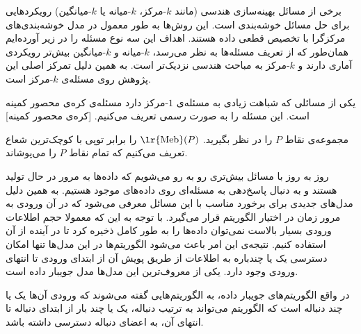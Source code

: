 برخی از مسائل بهینه‌سازی هندسی (مانند $k$-مرکز، $k$-میانه یا $k$-میانگین) رویکردهایی برای حل مسائل خوشه‌بندی است. این روش‌ها به طور معمول در مدل خوشه‌بندی‌های مرکزگرا با تخصیص قطعی داده هستند.  اهداف این سه نوع مسئله را در زیر آورده‌ایم
 
همان‌طور که از تعریف مسئله‌ها به نظر می‌رسد، $k$-میانه و $k$-میانگین بیش‌تر رویکردی آماری دارند و $k$-مرکز به مباحث هندسی نزدیک‌تر است. به همین دلیل تمرکز اصلی این پژوهش روی مسئله‌ی $k$-مرکز است.

یکی از مسائلی که شباهت زیادی به مسئله‌ی $1$-مرکز دارد مسئله‌ی کره‌ی محصور کمینه است. این مسئله را به صورت رسمی تعریف می‌کنیم.
[کره‌ی محصور کمینه]

مجموعه‌ی نقاط $P$ را در نظر بگیرید. $\text{\lr{Meb}}(P)$ را برابر توپی با کوچک‌ترین شعاع تعریف می‌کنیم که تمام نقاط $P$ را می‌پوشاند.

روز به روز با مسائل بیش‌تری رو به رو می‌شویم که داده‌ها به مرور در حال تولید هستند و به دنبال پاسخ‌دهی به مسئله‌ای روی داده‌های موجود هستیم. به همین دلیل مدل‌های جدیدی برای برخورد مناسب با این مسائل معرفی می‌شود که در آن ورودی به مرور زمان در اختیار الگوریتم قرار می‌گیرد.
با توجه به این که معمولا حجم اطلاعات ورودی بسیار بالاست نمی‌توان داده‌ها را به طور کامل ذخیره کرد تا در آینده از آن استفاده کنیم.  نتیجه‌ی این امر باعث می‌شود الگوریتم‌ها در این مدل‌ها تنها امکان دسترسی یک یا چندباره به اطلاعات از طریق پویش آن از ابتدای ورودی تا انتهای ورودی وجود دارد. یکی از معروف‌ترین این مدل‌ها مدل جویبار داده است.

در واقع الگوریتم‌های جویبار داده، به الگوریتم‌هایی گفته می‌شوند که ورودی آن‌ها یک یا چند دنباله است که الگوریتم می‌تواند به ترتیب دنباله، یک یا چند بار از ابتدای دنباله تا انتهای آن، به اعضای دنباله دسترسی داشته باشد.


